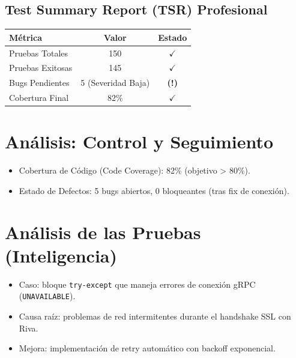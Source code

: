 \documentclass[12pt,a4paper]{article}
\begin{document}
\subsection{Test Summary Report (TSR) Profesional}
\begin{table}[h!]
\centering
\renewcommand{\arraystretch}{1.2}
\begin{tabular}{|l|c|c|}
\hline
\rowcolor{headergrey} \textbf{Métrica} & \textbf{Valor} & \textbf{Estado} \\ \hline
Pruebas Totales & 150 & \cellcolor{statusgreen} $\checkmark$ \\ \hline
Pruebas Exitosas & 145 & \cellcolor{statusgreen} $\checkmark$ \\ \hline
Bugs Pendientes & 5 (Severidad Baja) & \cellcolor{statusyellow} \textbf{(!)} \\ \hline
Cobertura Final & 82\% & \cellcolor{statusgreen} $\checkmark$ \\ \hline
\end{tabular}
\end{table}

\section{Análisis: Control y Seguimiento}
\begin{itemize}
  \item Cobertura de Código (Code Coverage): 82\% (objetivo > 80\%).
  \item Estado de Defectos: 5 bugs abiertos, 0 bloqueantes (tras fix de conexión).
\end{itemize}

\section{Análisis de las Pruebas (Inteligencia)}
\begin{itemize}
  \item Caso: bloque \texttt{try-except} que maneja errores de conexión gRPC (\texttt{UNAVAILABLE}).
  \item Causa raíz: problemas de red intermitentes durante el handshake SSL con Riva.
  \item Mejora: implementación de retry automático con backoff exponencial.
\end{itemize}
\end{document}
